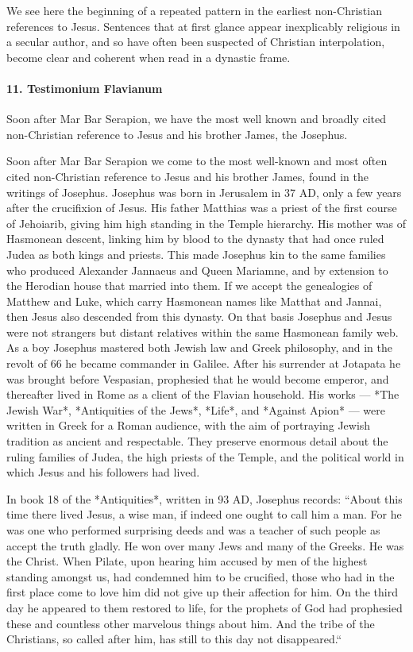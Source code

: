 We see here the beginning of a repeated pattern in the earliest non-Christian references to Jesus.
Sentences that at first glance appear inexplicably religious in a secular author, and so have often been suspected of Christian interpolation, become clear and coherent when read in a dynastic frame.

\paragraph{11.
Testimonium Flavianum}\label{par:testimonium-flavianum}

Soon after Mar Bar Serapion, we have the most well known and broadly cited non-Christian reference to Jesus and his brother James, the Josephus.

Soon after Mar Bar Serapion we come to the most well-known and most often cited non-Christian reference to Jesus and his brother James, found in the writings of Josephus.
Josephus was born in Jerusalem in 37 AD, only a few years after the crucifixion of Jesus.
His father Matthias was a priest of the first course of Jehoiarib, giving him high standing in the Temple hierarchy.
His mother was of Hasmonean descent, linking him by blood to the dynasty that had once ruled Judea as both kings and priests.
This made Josephus kin to the same families who produced Alexander Jannaeus and Queen Mariamne, and by extension to the Herodian house that married into them.
If we accept the genealogies of Matthew and Luke, which carry Hasmonean names like Matthat and Jannai, then Jesus also descended from this dynasty.
On that basis Josephus and Jesus were not strangers but distant relatives within the same Hasmonean family web.
As a boy Josephus mastered both Jewish law and Greek philosophy, and in the revolt of 66 he became commander in Galilee.
After his surrender at Jotapata he was brought before Vespasian, prophesied that he would become emperor, and thereafter lived in Rome as a client of the Flavian household.
His works — *The Jewish War*, *Antiquities of the Jews*, *Life*, and *Against Apion* — were written in Greek for a Roman audience, with the aim of portraying Jewish tradition as ancient and respectable.
They preserve enormous detail about the ruling families of Judea, the high priests of the Temple, and the political world in which Jesus and his followers had lived.

In book 18 of the *Antiquities*, written in 93 AD, Josephus records:
``About this time there lived Jesus, a wise man, if indeed one ought to call him a man.
For he was one who performed surprising deeds and was a teacher of such people as accept the truth gladly.
He won over many Jews and many of the Greeks.
He was the Christ.
When Pilate, upon hearing him accused by men of the highest standing amongst us, had condemned him to be crucified, those who had in the first place come to love him did not give up their affection for him.
On the third day he appeared to them restored to life, for the prophets of God had prophesied these and countless other marvelous things about him.
And the tribe of the Christians, so called after him, has still to this day not disappeared.``

